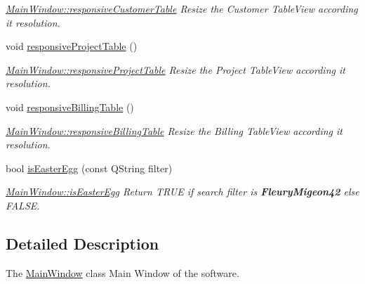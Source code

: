 \begin{DoxyCompactItemize}
\begin{DoxyCompactList}\small\item\em \hyperlink{classGui_1_1MainWindow_a0bf829effb9cb3e42ba063335a15cf3d}{Main\-Window\-::responsive\-Customer\-Table} Resize the Customer Table\-View according it resolution. \end{DoxyCompactList}\item 
\hypertarget{classGui_1_1MainWindow_af7402e6aa57ddf139ba82fb49c497cab}{void \hyperlink{classGui_1_1MainWindow_af7402e6aa57ddf139ba82fb49c497cab}{responsive\-Project\-Table} ()}\label{classGui_1_1MainWindow_af7402e6aa57ddf139ba82fb49c497cab}

\begin{DoxyCompactList}\small\item\em \hyperlink{classGui_1_1MainWindow_af7402e6aa57ddf139ba82fb49c497cab}{Main\-Window\-::responsive\-Project\-Table} Resize the Project Table\-View according it resolution. \end{DoxyCompactList}\item 
\hypertarget{classGui_1_1MainWindow_aff185fab5a7499468d8523d4db1592c9}{void \hyperlink{classGui_1_1MainWindow_aff185fab5a7499468d8523d4db1592c9}{responsive\-Billing\-Table} ()}\label{classGui_1_1MainWindow_aff185fab5a7499468d8523d4db1592c9}

\begin{DoxyCompactList}\small\item\em \hyperlink{classGui_1_1MainWindow_aff185fab5a7499468d8523d4db1592c9}{Main\-Window\-::responsive\-Billing\-Table} Resize the Billing Table\-View according it resolution. \end{DoxyCompactList}\item 
bool \hyperlink{classGui_1_1MainWindow_a2cacb5b7aa0109215473a6e59d28151c}{is\-Easter\-Egg} (const Q\-String filter)
\begin{DoxyCompactList}\small\item\em \hyperlink{classGui_1_1MainWindow_a2cacb5b7aa0109215473a6e59d28151c}{Main\-Window\-::is\-Easter\-Egg} Return T\-R\-U\-E if search {\itshape filter} is {\bfseries Fleury\-Migeon42} else F\-A\-L\-S\-E. \end{DoxyCompactList}\end{DoxyCompactItemize}


\subsection{Detailed Description}
The \hyperlink{classGui_1_1MainWindow}{Main\-Window} class Main Window of the software. 

